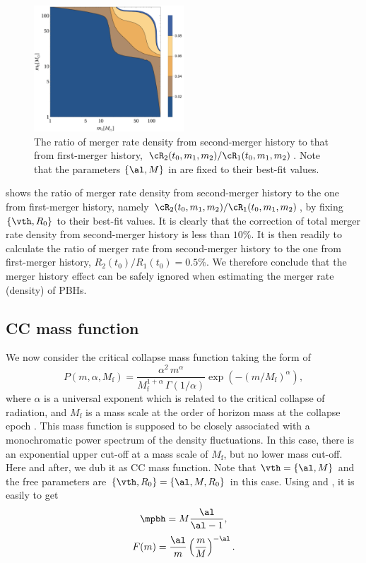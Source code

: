 \documentclass[twocolumn]{aastex631}
\def\({\left(}
\def\){\right)}
\def\e{\begin{equation}}
\def\q{\end{equation}}
\begin{document}
\begin{figure}[htbp!]
	\centering
	\includegraphics[width=0.5\textwidth]{ratio-bpower.pdf}
	\caption{\label{ratio-bpower}
		The ratio of merger rate density from second-merger history
		to that from first-merger history,
		$\cR_2(t_0, m_1, m_2)/\cR_1(t_0, m_1, m_2)$. Note that the parameters $\{\al, M\}$ in  are fixed to their best-fit values.
	}
\end{figure}

 shows the ratio of merger rate density from second-merger history
to the one from first-merger history, namely 
$\cR_2(t_0, m_1, m_2)/\cR_1(t_0, m_1, m_2)$, by fixing $\{\vth, R_0\}$ to their best-fit values.
It is clearly that the correction of total merger rate density from 
second-merger history is less than $10\%$.
It is then readily to calculate the ratio of merger rate from 
second-merger history to the one from first-merger history, 
$R_2(t_0)/R_1(t_0) = 0.5\%$.
We therefore conclude that the merger history effect can be safely ignored
when estimating the merger rate (density) of PBHs.

\subsection{CC mass function}
We now consider the critical collapse mass function taking the form of \cite{Niemeyer:1997mt,Yokoyama:1998xd,Carr:2016hva,Gow:2020cou}
\e
P(m, \alpha, M_{\mathrm{f}})=\frac{\alpha^2\,  m^\alpha}{M_{\mathrm{f}}^{1+\alpha}\, \Gamma(1 / \alpha)} \exp \left(-(m/M_{\mathrm{f}})^{\alpha}\right),
\q
where $\alpha$ is a universal exponent which is related to the critical collapse of radiation, and $M_{\mathrm{f}}$ is a mass scale at the order of horizon mass at the collapse epoch \cite{Carr:2016hva}. This mass function is supposed to be closely associated with a monochromatic power spectrum of the density fluctuations. In this case, there is an exponential upper cut-off at a mass scale of $M_{\mathrm{f}}$, but no lower mass cut-off. Here and after, we dub it as CC mass function.
Note that $\vth=\{\al, M\}$ and the free parameters are 
$\{\vth, R_0\} = \{\al, M, R_0\}$ in this case. 
Using  and , it is easily to get
\e
\mpbh = M \frac{\al}{\al-1},
\q
\e 
F(m) = \frac{\al}{m} \(\frac{m}{M}\)^{-\al}.
\q
\end{document}
